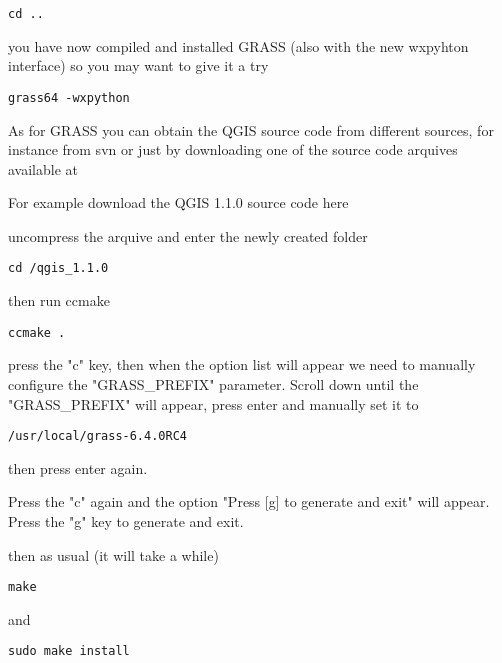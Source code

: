 \begin{verbatim}
cd ..
\end{verbatim}

you have now compiled and installed GRASS (also with the new wxpyhton interface) so you
may want to give it a try

\begin{verbatim}
grass64 -wxpython
\end{verbatim}

As for GRASS you can obtain the QGIS source code from different sources,
for instance from svn or just by downloading one of the source code arquives available
at 

For example download the QGIS 1.1.0 source code here 

uncompress the arquive and enter the newly created folder

\begin{verbatim}
cd /qgis_1.1.0
\end{verbatim}

then run ccmake

\begin{verbatim}
ccmake .
\end{verbatim}

press the "c" key, then when the option list will appear we need to manually
configure the "GRASS\_PREFIX" parameter. Scroll down until the "GRASS\_PREFIX" will appear, 
press enter and manually set it to

\begin{verbatim}
/usr/local/grass-6.4.0RC4
\end{verbatim}

then press enter again.

Press the "c" again and the option "Press [g] to generate and exit" will appear.
Press the "g" key to generate and exit.

then as usual (it will take a while)

\begin{verbatim}
make
\end{verbatim}

and

\begin{verbatim}
sudo make install
\end{verbatim}


